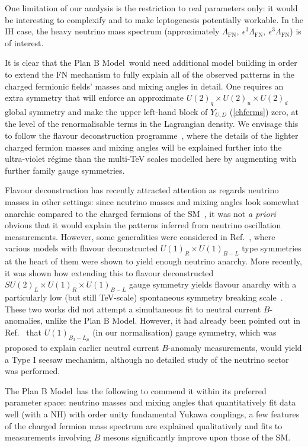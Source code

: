 \documentclass[11pt,letterpaper]{article}
\newcommand{\model}{Plan B Model}
\begin{document}
One limitation of our analysis is the
restriction to real parameters only: it would be interesting to complexify and
to make leptogenesis potentially workable. In the IH case, the
heavy neutrino mass spectrum (approximately $\Lambda_{\text{FN}},\ \epsilon^{3}\Lambda_{\text{FN}},\
\epsilon^3 \Lambda_{\text{FN}}$) is of interest.  

It is clear that the \model\ would need additional model building in order to extend the FN mechanism to fully explain all of the observed patterns in the charged fermionic fields' masses and mixing angles in detail. One requires an extra symmetry that will enforce an approximate $U(2)_q \times U(2)_u \times U(2)_d$ global symmetry and make the upper left-hand block of $Y_{U,D}$ (\ref{chferms}) zero, at the level of the renormalisable terms in the Lagrangian density.
We envisage this to follow the flavour deconstruction
programme~\cite{Bordone:2017bld,Greljo:2024ovt}, where the details of the
lighter charged fermion masses and mixing angles will be explained further
into the ultra-violet r\'egime than the multi-TeV scales modelled here
by augmenting with further family gauge symmetries.

Flavour deconstruction has recently attracted attention as regards neutrino masses in other settings: since neutrino masses and mixing angles look somewhat anarchic compared to the charged fermions of the SM~\cite{Hall:1999sn,deGouvea:2012ac}, it was not \emph{a priori} obvious that it would explain the patterns inferred from neutrino oscillation measurements. However, some generalities were considered in Ref.~\cite{Greljo:2024ovt}, where various models with flavour deconstructed $U(1)_R \times U(1)_{B-L}$ type symmetries at the heart of them were shown to yield enough neutrino anarchy. More recently, it was shown how extending this to flavour deconstructed $SU(2)_L \times U(1)_R \times U(1)_{B-L}$ gauge symmetry yields flavour anarchy with a particularly low (but still TeV-scale) spontaneous symmetry breaking scale~\cite{Isidori:2025rci}. 
These two works did not attempt a simultaneous fit to neutral current $B$-anomalies, unlike the \model. 
However, it had already been pointed out in Ref.~\cite{Bonilla:2017lsq} that
$U(1)_{B_3-L_\mu}$ (in our normalisation) gauge symmetry, which was proposed
to explain earlier 
neutral current $B$-anomaly measurements, would yield a Type I seesaw mechanism, although no detailed study of the neutrino sector was performed. 

The \model\ has the following to commend it within its preferred parameter space: neutrino masses and mixing angles
that quantitatively fit data well (with a NH) with order unity
fundamental Yukawa 
couplings, a few features of the charged fermion mass spectrum are explained
qualitatively and fits to measurements involving $B$ mesons significantly improve
upon those of the SM.
\end{document}

